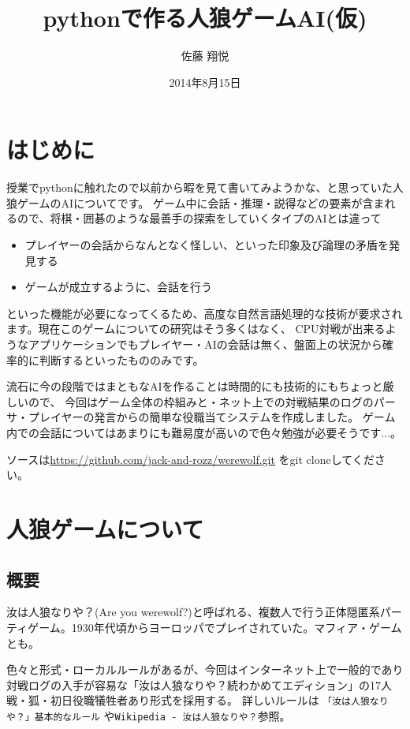 ﻿\documentclass[a4paper,twocolumn]{jsarticle}
\title{pythonで作る人狼ゲームAI(仮)}
\author{佐藤 翔悦}
\date{2014年8月15日}
\begin{document}
\setlength{\columnsep}{30pt}
\maketitle

\section{はじめに}
授業でpythonに触れたので以前から暇を見て書いてみようかな、と思っていた人狼ゲームのAIについてです。
ゲーム中に会話・推理・説得などの要素が含まれるので、将棋・囲碁のような最善手の探索をしていくタイプのAIとは違って

\begin{itemize}
\item プレイヤーの会話からなんとなく怪しい、といった印象及び論理の矛盾を発見する
\item ゲームが成立するように、会話を行う
\end{itemize}
といった機能が必要になってくるため、高度な自然言語処理的な技術が要求されます。現在このゲームについての研究はそう多くはなく、
CPU対戦が出来るようなアプリケーションでもプレイヤー・AIの会話は無く、盤面上の状況から確率的に判断するといったもののみです。

流石に今の段階ではまともなAIを作ることは時間的にも技術的にもちょっと厳しいので、
今回はゲーム全体の枠組みと・ネット上での対戦結果のログのパーサ・プレイヤーの発言からの簡単な役職当てシステムを作成しました。
ゲーム内での会話についてはあまりにも難易度が高いので色々勉強が必要そうです...。

ソースは\url{https://github.com/jack-and-rozz/werewolf.git} をgit cloneしてください。

\section{人狼ゲームについて}

\subsection{概要}
汝は人狼なりや？(Are you werewolf?)と呼ばれる、複数人で行う正体隠匿系パーティゲーム。1930年代頃からヨーロッパでプレイされていた。マフィア・ゲームとも。

色々と形式・ローカルルールがあるが、今回はインターネット上で一般的であり対戦ログの入手が容易な「汝は人狼なりや？続わかめてエディション」\cite{wakamete}の17人戦・狐・初日役職犠牲者あり形式を採用する。 詳しいルールは \verb+「汝は人狼なりや？」基本的なルール+ \cite{jinrourule}や\verb+Wikipedia - 汝は人狼なりや？+\cite{wikipedia-jinrou}参照。
\end{document}
